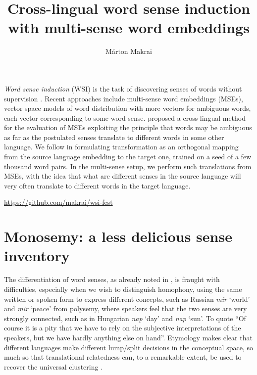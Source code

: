 \documentclass[11pt]{article}
\title{Cross-lingual word sense induction with multi-sense word embeddings}
\author{
  Márton Makrai \\
}
\date{}
\begin{document}
\maketitle

\hspace{2cm}


\emph{Word sense induction} (WSI) is the task of discovering senses of words
without supervision \citep{Schutze:1998}. Recent approaches include multi-sense
word embeddings (MSEs), vector space models of word distribution with more
vectors for ambiguous words, each vector corresponding to some word sense.
\cite{Borbely:2016} proposed a cross-lingual method for the evaluation of MSEs
exploiting the principle that words may be ambiguous as far as the postulated
senses translate to different words in some other language. We follow
\cite{Xing:2015} in formulating transformation as an orthogonal mapping from
the source language embedding to the target one, trained on a seed of a few
thousand word pairs. In the multi-sense setup, we perform such translations
from MSEs, with the idea that what are different senses in the source language
will very often translate to different words in the target language.

\url{https://github.com/makrai/wsi-fest}

\section{Monosemy: a less delicious sense inventory}

The differentiation of word senses, as already noted in \cite{Borbely:2016}, is
fraught with difficulties, especially when we wish to distinguish homophony,
using the same written or spoken form to express different concepts, such as
Russian {\it mir} `world' and {\it mir} `peace' from polysemy, where speakers
feel that the two senses are very strongly connected, such as in Hungarian {\it
nap} `day' and {\it nap} `sun'.  To quote \cite{Zgusta:1971} ``Of course it is
a pity that we have to rely on the subjective interpretations of the speakers,
but we have hardly anything else on hand''. Etymology makes clear that
different languages make different lump/split decisions in the conceptual
space, so much so that translational relatedness can, to a remarkable extent,
be used to recover the universal clustering \citep{Youn:2016}.
\end{document}

